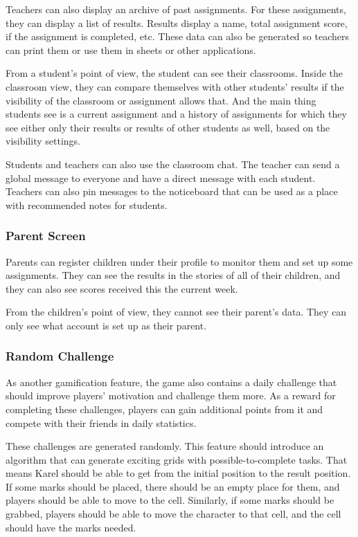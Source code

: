 Teachers can also display an archive of past assignments.
For these assignments, they can display a list of results.
Results display a name, total assignment score, if the assignment is completed, etc.
These data can also be generated so teachers can print them or use them in sheets or other applications.

From a student's point of view, the student can see their classrooms.
Inside the classroom view, they can compare themselves with other students' results if the visibility of the classroom or assignment allows that.
And the main thing students see is a current assignment and a history of assignments for which they see either only their results or results of other students as well, based on the visibility settings.

Students and teachers can also use the classroom chat.
The teacher can send a global message to everyone and have a direct message with each student.
Teachers can also pin messages to the noticeboard that can be used as a place with recommended notes for students.

\subsubsection{Parent Screen}

Parents can register children under their profile to monitor them and set up some assignments.
They can see the results in the stories of all of their children, and they can also see scores received this the current week.

From the children's point of view, they cannot see their parent's data.
They can only see what account is set up as their parent.

\subsubsection{Random Challenge}

As another gamification feature, the game also contains a daily challenge that should improve players' motivation and challenge them more. 
As a reward for completing these challenges, players can gain additional points from it and compete with their friends in daily statistics.

These challenges are generated randomly.
This feature should introduce an algorithm that can generate exciting grids with possible-to-complete tasks.
That means Karel should be able to get from the initial position to the result position.
If some marks should be placed, there should be an empty place for them, and players should be able to move to the cell.
Similarly, if some marks should be grabbed, players should be able to move the character to that cell, and the cell should have the marks needed.

